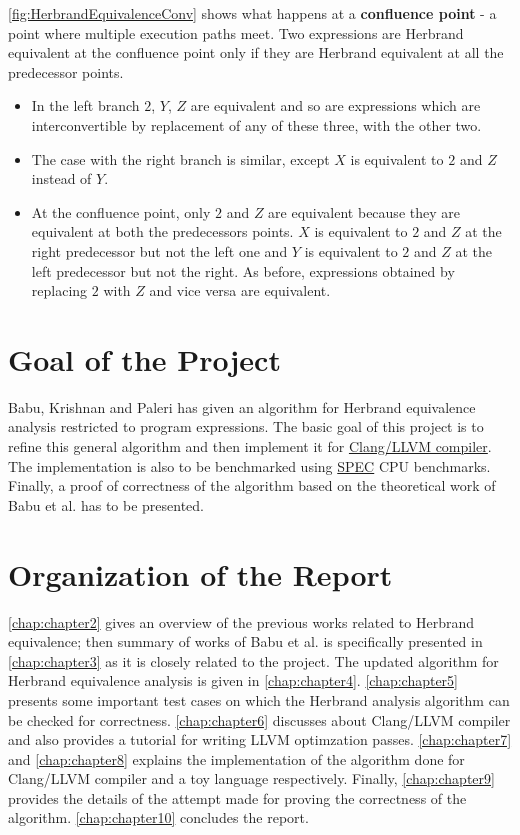 \autoref{fig:HerbrandEquivalenceConv} shows what happens at a 
\textbf{confluence point} - a point where multiple execution paths meet. 
Two expressions are Herbrand equivalent at the confluence point only if 
they are Herbrand equivalent at all the predecessor points.
\begin{itemize}
    \item   In the left branch $2$, $Y$, $Z$ are equivalent and 
    so are expressions which are interconvertible by replacement 
    of any of these three, with the other two.
    \item   The case with the right branch is similar, except $X$ is 
    equivalent to $2$ and $Z$ instead of $Y$.
    \item   At the confluence point, only $2$ and $Z$ are equivalent 
    because they are equivalent at both the predecessors points. $X$ 
    is equivalent to $2$ and $Z$ at the right predecessor but not 
    the left one and $Y$ is equivalent to $2$ and $Z$ at the left 
    predecessor but not the right. As before, expressions obtained by 
    replacing $2$ with $Z$ and vice versa are equivalent.
\end{itemize}

\section{Goal of the Project}
\label{sec:GoalOfTheProject}
Babu, Krishnan and Paleri \cite{Babu} has given an algorithm for 
Herbrand equivalence analysis restricted to program expressions. The 
basic goal of this project is to refine this general algorithm and 
then implement it for \href{https://llvm.org/}{Clang/LLVM compiler}. 
The implementation is also to be benchmarked using \href{https://www.spec.org/}
{SPEC} CPU benchmarks. Finally, a proof of correctness of the 
algorithm based on the theoretical work of Babu et al. \cite{Babu} 
has to be presented.

\section{Organization of the Report}
\label{sec:OrganizationOfTheReport}
\autoref{chap:chapter2} gives an overview of the previous works 
related to Herbrand equivalence; then summary of works of Babu et al. 
\cite{Babu} is specifically presented in \autoref{chap:chapter3} as 
it is closely related to the project. The updated algorithm for 
Herbrand equivalence analysis is given in \autoref{chap:chapter4}. 
\autoref{chap:chapter5} presents some important test cases on which 
the Herbrand analysis algorithm can be checked for correctness. 
\autoref{chap:chapter6} discusses about Clang/LLVM compiler and also 
provides a tutorial for writing LLVM optimzation passes. 
\autoref{chap:chapter7} and \autoref{chap:chapter8} explains the 
implementation of the algorithm done for Clang/LLVM compiler and a 
toy language respectively. Finally, \autoref{chap:chapter9} provides 
the details of the attempt made for proving the correctness of the 
algorithm. \autoref{chap:chapter10} concludes the report.
